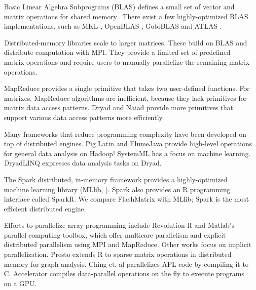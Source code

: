 Basic Linear Algebra Subprograms (BLAS) defines a small set of vector and
matrix operations for shared memory.. There exist a few
highly-optimized BLAS implementations, such as MKL \cite{mkl}, OpenBLAS
\cite{openblas}, GotoBLAS \cite{Goto} and ATLAS \cite{atlas}. 

Distributed-memory libraries \cite{trilinos, petsc, elemental}
scale to larger matrices. 
These build on BLAS and distribute computation with MPI.
They provide a limited set of predefined matrix operations and
require users to manually parallelize the remaining matrix operations.

MapReduce \cite{mapreduce} 
provides a single primitive that takes two user-defined functions. 
For matrixes, MapReduce algorithms are inefficient, because they lack
primitives for matrix data access patterns.
Dryad \cite{dryad} and Naiad \cite{naiad} provide more primitives 
that support various data access patterns more efficiently.

Many frameworks that reduce programming complexity have been developed on top of distributed engines.
Pig Latin \cite{pig} and FlumeJava \cite{flumejava}
provide high-level operations for general data analysis on Hadoop!
SystemML \cite{systemml} has a focus on machine learning. 
DryadLINQ \cite{dryadlinq} expresses data analysis tasks on Dryad. 

The Spark \cite{spark} distributed, in-memory framework
provides a highly-optimized machine learning library (MLlib, \cite{mllib}).
Spark also provides an R programming interface called SparkR.  
We compare FlashMatrix with MLlib; Spark is the most efficient distributed engine.

Efforts to parallelize array programming include
Revolution R \cite{rre} and Matlab's parallel computing toolbox, which
offer multicore parallelism and explicit distributed parallelism using MPI and MapReduce. 
Other works focus on implicit parallelization.
Presto \cite{presto} extends R to sparse matrix operations in distributed memory for graph
analysis. Ching et. al \cite{Ching12} parallelizes APL code by
compiling it to C. Accelerator \cite{accelerator} compiles
data-parallel operations on the fly to execute programs on a GPU.
